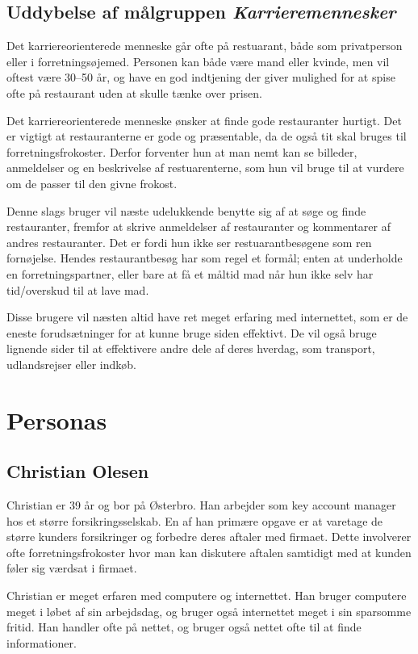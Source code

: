 \documentclass[a4paper, 12pt]{article}
\begin{document}
\subsection{Uddybelse af målgruppen \emph{Karrieremennesker}}
Det karriereorienterede menneske går ofte på restuarant, både som privatperson
eller i forretningsøjemed. Personen kan både være mand eller kvinde, men vil
oftest være 30--50 år, og have en god indtjening der giver mulighed for at spise
ofte på restaurant uden at skulle tænke over prisen.

Det karriereorienterede menneske ønsker at finde gode restauranter hurtigt. Det
er vigtigt at restauranterne er gode og præsentable, da de også tit skal bruges
til forretningsfrokoster. Derfor forventer hun at man nemt kan se billeder,
anmeldelser og en beskrivelse af restuarenterne, som hun vil bruge til at
vurdere om de passer til den givne frokost. 

Denne slags bruger vil næste udelukkende benytte sig af at søge og finde
restauranter, fremfor at skrive anmeldelser af restauranter og kommentarer af
andres restauranter. Det er fordi hun ikke ser restuarantbesøgene som ren
fornøjelse. Hendes restaurantbesøg har som regel et formål; enten at underholde
en forretningspartner, eller bare at få et måltid mad når hun ikke selv har
tid/overskud til at lave mad. 

Disse brugere vil næsten altid have ret meget erfaring med internettet, som er
de eneste forudsætninger for at kunne bruge siden effektivt. De vil også bruge
lignende sider til at effektivere andre dele af deres hverdag, som transport,
udlandsrejser eller indkøb.

\section{Personas}
\label{sec:Personas}

\subsection{Christian Olesen}
Christian er 39 år og bor på Østerbro. Han arbejder som key account manager hos
et større forsikringsselskab. En af han primære opgave er at varetage de større
kunders forsikringer og forbedre deres aftaler med firmaet. Dette involverer
ofte forretningsfrokoster hvor man kan diskutere aftalen samtidigt med at kunden
føler sig værdsat i firmaet.

Christian er meget erfaren med computere og internettet. Han bruger computere
meget i løbet af sin arbejdsdag, og bruger også internettet meget i sin
sparsomme fritid. Han handler ofte på nettet, og bruger også nettet ofte til at
finde informationer. 
\end{document}
